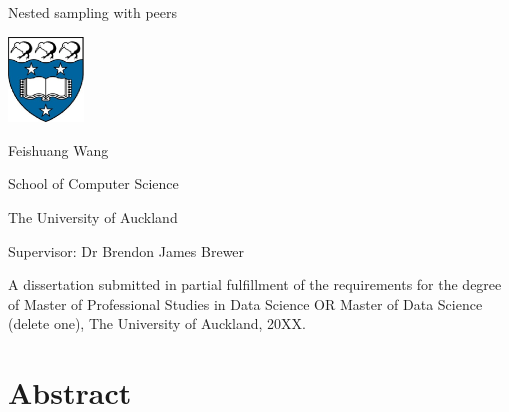 \documentclass[11pt]{book}
\begin{document}
\pagestyle{empty}



\begin{center}

\vspace{1cm}

{\Huge         Nested sampling with peers}

\vspace{35mm} 

\includegraphics[width=2cm]{logo}

 \vspace{45mm}

{\Large       Feishuang Wang}

	\vspace{1ex}

School of Computer Science

The University of Auckland

	\vspace{5ex}

Supervisor:             Dr Brendon James Brewer

	\vspace{30mm}

A dissertation  submitted in partial fulfillment of the requirements for the degree of Master of Professional Studies in Data Science OR Master of Data Science (delete one), The University of Auckland, 20XX.

\end{center}


  \newpage



\chapter*{Abstract}       
\setcounter{page}{1}
\pagestyle{headings}
\end{document}
